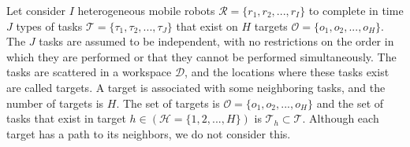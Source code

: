 \documentclass[]{interact}
\theoremstyle{plain}%
\theoremstyle{definition}
\theoremstyle{remark}
\begin{document}
Let consider $I$ heterogeneous mobile robots $\mathcal{R}=\{r_1,r_2,...,r_I\}$ to complete in time $J$ types of tasks $\mathcal{T}=\{\tau_1,\tau_2,...,\tau_J\}$ that exist on $H$ targets $\mathcal{O}=\{o_1,o_2,...,o_H\}$.
The $J$ tasks are assumed to be independent, with no restrictions on the order in which they are performed or that they cannot be performed simultaneously.
The tasks are scattered in a workspace $\mathcal{D}$, and the locations where these tasks exist are called targets. 
A target is associated with some neighboring tasks, and the number of targets is $H$. 
The set of targets is $\mathcal{O} = \{o_1,o_2,...,o_H\}$ and the set of tasks that exist in target $h\in(\mathcal{H}=\{1,2,...,H\})$ is $\mathcal{T}_h\subset \mathcal{T}$. 
Although each target has a path to its neighbors, we do not consider this.
\end{document}
